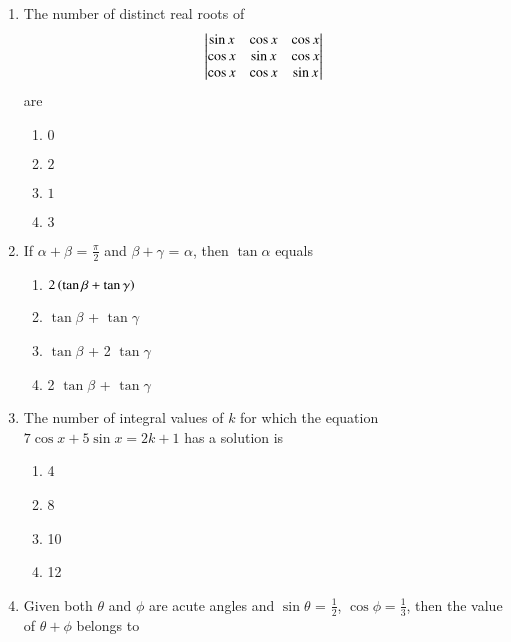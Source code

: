 \begin{enumerate}[label=\thesubsection.\arabic*,ref=\thesubsection.\theenumi]
\begin{multicols}{4}
\begin{enumerate}
                \item $x=y,x\neq0$
                \item $x=y$ 
                \item $x\neq0,y\neq0$
        \end{enumerate}
\end{multicols}
    \item The number of distinct real roots of
        \hfill{}
    \begin{align*}
	    \begin{vmatrix}
		\sin{x}&\cos{x}&\cos{x}
		\\
    		\cos{x}&\sin{x}&\cos{x}
		\\
		\cos{x}&\cos{x}&\sin{x}\end{vmatrix}
    \end{align*}
    are
        \begin{multicols}{4}
\begin{enumerate}
                \item $0$
                \item $2$
                \item $1$
                \item $3$
        \end{enumerate}
\end{multicols}
\item If $\alpha + \beta$ = $\frac{\pi}{2}$ and $\beta + \gamma$ = $\alpha$, then $\tan \alpha$ equals
\hfill{}
\begin{multicols}{4}
\begin{enumerate}
\item $2\left(\tan \beta + \tan \gamma\right)$
\columnbreak
\item $\tan\beta$ + $\tan\gamma$
\item $\tan\beta$ + 2 $\tan\gamma$
\item 2 $\tan\beta$ + $\tan\gamma$
\end{enumerate}
\end{multicols}
\item The number of integral values of $k$ for which the equation $7\cos x + 5\sin x = 2k+1$ has a solution is
\hfill{}
\begin{multicols}{4}
\begin{enumerate}
\item 4
\item 8
\item 10
\item 12 
\end{enumerate}
\end{multicols}
\item Given both $\theta$ and $\phi$ are acute angles and $\sin\theta$ = $\frac{1}{2}$, $\cos\phi = \frac{1}{3}$, then the value of $\theta + \phi$ belongs to

\end{enumerate}
